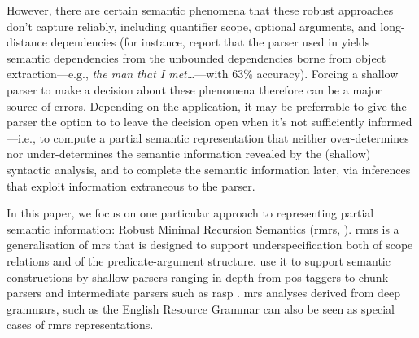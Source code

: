 However, there are certain semantic
phenomena that these robust
approaches don't capture reliably, including quantifier scope, optional
arguments,
% 
and long-distance dependencies (for instance, \cite{clark:etal:2004}
report that the parser used in \cite{bos:etal:2004} yields semantic
dependencies from the unbounded dependencies borne from object
extraction---e.g., {\em the man that I met\dots}---with 63\%
accuracy).  Forcing a shallow parser to make a decision about these
phenomena therefore can be a major source of errors.  Depending on the
application, it may be preferrable to give the parser the option to to
leave the decision open when it's not sufficiently informed---i.e., to
compute a partial semantic representation that neither over-determines
nor under-determines the semantic information revealed by the
(shallow) syntactic analysis, and to complete the semantic information
later, via inferences that exploit information extraneous to the
parser.

In this paper, we focus on one particular approach to representing
partial semantic information:
Robust Minimal Recursion Semantics ({\sc rmrs},
\cite{copestake:2003}).  {\sc rmrs} is a generalisation of {\sc mrs}
\cite{copestake:etal:2005} that is designed to support underspecification both
of scope relations and of the predicate-argument structure.
\cite{copestake:2003,frank:2004} use it to
support semantic constructions by shallow parsers
ranging in depth from {\sc pos} taggers to chunk parsers  
and intermediate parsers such as {\sc rasp}
\cite{briscoe:etal:2006}.  {\sc mrs} analyses
derived from deep grammars, such as the English Resource Grammar
\cite{copestake:flickinger:2000} can also be seen as special cases of
{\sc rmrs} representations.

